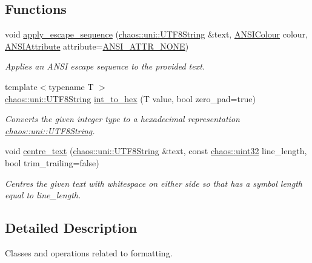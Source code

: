 \subsection*{Functions}
\begin{DoxyCompactItemize}
\item 
void \hyperlink{namespacechaos_1_1io_1_1format_ae9aebf86c855cb5ed332902264a507b7}{apply\-\_\-escape\-\_\-sequence} (\hyperlink{classchaos_1_1uni_1_1_u_t_f8_string}{chaos\-::uni\-::\-U\-T\-F8\-String} \&text, \hyperlink{namespacechaos_1_1io_1_1format_aa30dcff2478ffc94e33504c8886a5b1a}{A\-N\-S\-I\-Colour} colour, \hyperlink{namespacechaos_1_1io_1_1format_af01119682ec0bc616b49641e0c2a7ccf}{A\-N\-S\-I\-Attribute} attribute=\hyperlink{namespacechaos_1_1io_1_1format_af01119682ec0bc616b49641e0c2a7ccfa3154b286513beb167bb516ea15f1cfb5}{A\-N\-S\-I\-\_\-\-A\-T\-T\-R\-\_\-\-N\-O\-N\-E})
\begin{DoxyCompactList}\small\item\em Applies an A\-N\-S\-I escape sequence to the provided text. \end{DoxyCompactList}\item 
{\footnotesize template$<$typename T $>$ }\\\hyperlink{classchaos_1_1uni_1_1_u_t_f8_string}{chaos\-::uni\-::\-U\-T\-F8\-String} \hyperlink{namespacechaos_1_1io_1_1format_a1a0d0c026284787a225be9073770e264}{int\-\_\-to\-\_\-hex} (T value, bool zero\-\_\-pad=true)
\begin{DoxyCompactList}\small\item\em Converts the given integer type to a hexadecimal representation \hyperlink{classchaos_1_1uni_1_1_u_t_f8_string}{chaos\-::uni\-::\-U\-T\-F8\-String}. \end{DoxyCompactList}\item 
void \hyperlink{namespacechaos_1_1io_1_1format_ac53c87508bb81f6fc26efd9bfca7b027}{centre\-\_\-text} (\hyperlink{classchaos_1_1uni_1_1_u_t_f8_string}{chaos\-::uni\-::\-U\-T\-F8\-String} \&text, const \hyperlink{namespacechaos_a8641b3ae4551f0b35570d4f9f4ec22d9}{chaos\-::uint32} line\-\_\-length, bool trim\-\_\-trailing=false)
\begin{DoxyCompactList}\small\item\em Centres the given text with whitespace on either side so that has a symbol length equal to line\-\_\-length. \end{DoxyCompactList}\end{DoxyCompactItemize}


\subsection{Detailed Description}
Classes and operations related to formatting. 

